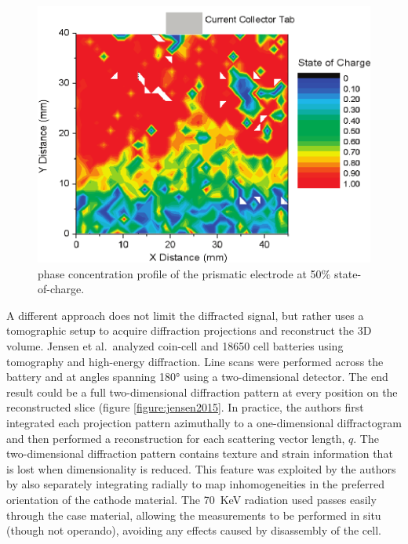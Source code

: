 \documentclass[journal=cmatex,manuscript=perspective]{achemso}
\begin{document}
\begin{figure}
  \includegraphics[width=\textwidth]{liu2010.png}
  \caption{ phase concentration profile of the prismatic
    electrode at 50\% state-of-charge.\cite{liu2010}}
  \label{figure:liu2010}
\end{figure}

A different approach does not limit the diffracted signal, but rather
uses a tomographic setup to acquire diffraction projections and
reconstruct the 3D volume. Jensen et al.\ analyzed coin-cell and 18650
cell batteries using tomography and high-energy
diffraction\cite{jensen2015}. Line scans were performed across the
battery and at angles spanning \ang{180} using a two-dimensional
detector. The end result could be a full two-dimensional diffraction
pattern at every position on the reconstructed slice (figure
\ref{figure:jensen2015}. In practice, the authors first integrated
each projection pattern azimuthally to a one-dimensional diffractogram
and then performed a reconstruction for each scattering vector length,
$q$. The two-dimensional diffraction pattern contains texture and
strain information\cite{bobhe} that is lost when dimensionality is
reduced. This feature was exploited by the authors by also separately
integrating radially to map inhomogeneities in the preferred
orientation of the  cathode material. The \SI{70}{KeV}
radiation used passes easily through the case material, allowing the
measurements to be performed in situ (though not operando), avoiding
any effects caused by disassembly of the cell.
\end{document}
